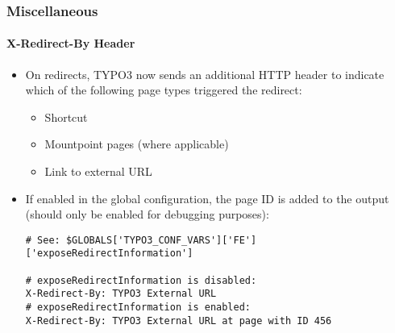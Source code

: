 %

\begin{frame}[fragile]
	\frametitle{Miscellaneous}
	\framesubtitle{X-Redirect-By Header}


	\begin{itemize}
		\item On redirects, TYPO3 now sends an additional HTTP header to indicate
			which of the following page types triggered the redirect:
			\begin{itemize}\small
				\item Shortcut
				\item Mountpoint pages (where applicable)
				\item Link to external URL
			\end{itemize}\normalsize
		\item If enabled in the global configuration, the page ID is added to the output
			(should only be enabled for debugging purposes):
\begin{lstlisting}
# See: $GLOBALS['TYPO3_CONF_VARS']['FE']['exposeRedirectInformation']

# exposeRedirectInformation is disabled:
X-Redirect-By: TYPO3 External URL
# exposeRedirectInformation is enabled:
X-Redirect-By: TYPO3 External URL at page with ID 456
\end{lstlisting}

	\end{itemize}

\end{frame}

